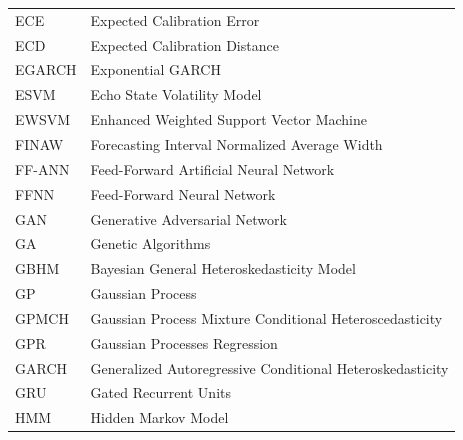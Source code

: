 \begin{table}[H]
\begin{subtable}[t]{0.49\textwidth}
\begin{tabular}{lp{}}
        ECE & Expected Calibration Error \\
        ECD & Expected Calibration Distance \\
        EGARCH & Exponential GARCH \\
        ESVM & Echo State Volatility Model \\
        EWSVM & Enhanced Weighted Support Vector Machine \\
        FINAW & Forecasting Interval Normalized Average Width \\
        FF-ANN & Feed-Forward Artificial Neural Network \\
        FFNN & Feed-Forward Neural Network \\
        GAN & Generative Adversarial Network \\
        GA & Genetic Algorithms \\
        GBHM & Bayesian General Heteroskedasticity Model \\
        GP & Gaussian Process \\
        GPMCH & Gaussian Process Mixture Conditional Heteroscedasticity \\
        GPR & Gaussian Processes Regression \\
        GARCH & Generalized Autoregressive Conditional Heteroskedasticity \\
        GRU & Gated Recurrent Units \\
        HMM & Hidden Markov Model \\
        

\end{tabular}
\end{subtable}
\end{table}
